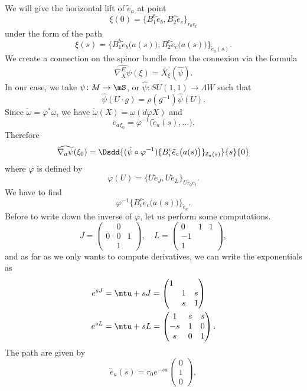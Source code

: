 We will give the horizontal lift of $\tilde{e}_a$ at point
\[ 
  \xi(0)=\{ B_1^b\tilde{e}_b,B_2^c\tilde{e}_c \}_{r_0e_t}
\]
under the form of the path
\[ 
  \xi(s)=\{ B_1^b\tilde{e}_b\big( a(s) \big),B_2^c\tilde{e}_c\big( a(s) \big) \}_{\tilde{e}_a(s)}.
\]
We create a connection on the spinor bundle from the connexion via the formula
\[ 
  \widehat{\nabla_X^E\psi}(\xi)=\overline{ X }_{\xi}(\hat \psi).
\]
In our case, we take $\psi\colon M\to \mS$, or $\hat{\psi}\colon SU(1,1)\to \Lambda W$ such that
\[ 
  \hat{\psi}(U\cdot g)=\rho(g^{-1})\hat{\psi}(U).
\]
Since $\tilde\omega=\varphi^*\omega$, we have $\tilde\omega(X)=\omega(d\varphi X)$ and
\[ 
  \overline{ e }_a{}_{\xi_0}=\varphi^{-1}\big( \tilde{e}_a(s),\ldots \big).
\]
Therefore
\begin{equation}  \label{eq_whidpsinabla}
\widehat{\nabla_a\psi}(\xi_0)=\Dsdd{ (\hat{\psi}\circ\varphi^{-1})\{ B_i^c\tilde{e}_c\big( a(s) \big) \}_{\tilde{e}_a(s)} }{s}{0}
\end{equation}
where $\varphi$ is defined by
\[ 
  \varphi(U)=\{ U\tilde{e}_J,U\tilde{e}_L \}_{Ur_0e_t}.
\]
We have to find
\begin{equation}  \label{eq_varpBic}
  \varphi^{-1}\{ B_i^c\tilde{e}_c\big( a(s) \big) \}_{\tilde{e}_a}.
\end{equation}
Before to write down the inverse of $\varphi$, let us perform some computations.
\[ 
  J=\begin{pmatrix}
&0\\
0&0&1\\
&1
\end{pmatrix},\quad
L=\begin{pmatrix}
0&1&1\\
-1\\
1
\end{pmatrix},
\]
and as far as we only wants to compute derivatives, we can write the exponentials as
\begin{align} 
 e^{sJ}&=\mtu+sJ=\begin{pmatrix}
1\\
&1&s\\
&s&1
\end{pmatrix}\\
 e^{sL}&=\mtu+sL=\begin{pmatrix}
1&s&s\\
-s&1&0\\
s&0&1
\end{pmatrix}.
\end{align}
The path are given by
\begin{equation}
\tilde{e}_a(s)=r_0 e^{-sa}\begin{pmatrix}
0\\1\\0
\end{pmatrix},
\end{equation}
